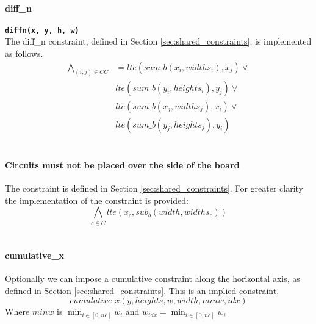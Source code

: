     \paragraph*{diff\_n}
      \texttt\textbf{diffn(x, y, h, w)}\\
      The diff\_n constraint, defined in Section \ref{sec:shared_constraints}, is implemented
      as follows.
      \begin{equation*}
          \begin{split}
              \bigwedge_{(i, j) \in CC}&=
              lte(sum\_b(x_i, widths_i), x_j) \lor \\
              &lte(sum\_b(y_i, heights_i), y_j) \lor \\
              &lte(sum\_b(x_j, widths_j), x_i) \lor \\
              &lte(sum\_b(y_j, heights_j), y_i)
          \end{split}
      \end{equation*}\\

    \paragraph*{Circuits must not be placed over the side of the board}
      The constraint is defined in Section \ref{sec:shared_constraints}. 
      For greater clarity the implementation of the constraint is provided:
      \begin{equation*}
          \bigwedge_{c \in C} lte(x_c, sub_b(width, widths_c))
      \end{equation*}\\

    \paragraph*{cumulative\_x}
      Optionally we can impose a cumulative constraint along the horizontal axis, 
      as defined in Section \ref{sec:shared_constraints}.
      This is an implied constraint.
      \[cumulative\_x(y, heights, w, width, minw, idx) \]
      Where \(minw\) is \(\min_{i \in [0,nc]} w_i\) and \( w_{idx} 
      = \min_{i \in [0,nc]} w_i\)
      
    
